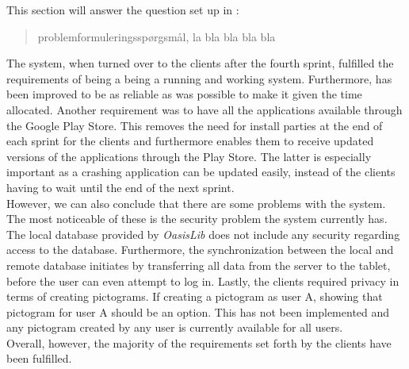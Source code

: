 This section will answer the question set up in :
\begin{quote}
problemformuleringsspørgsmål, la bla bla bla bla
\end{quote}

The system, when turned over to the clients after the fourth sprint, fulfilled the requirements of being a being a running and working system.
Furthermore, \launcher has been improved to be as reliable as was possible to make it given the time allocated.
Another requirement was to have all the \giraf applications available through the Google Play Store.
This removes the need for install parties at the end of each sprint for the clients and furthermore enables them to receive updated versions of the applications through the Play Store. 
The latter is especially important as a crashing application can be updated easily, instead of the clients having to wait until the end of the next sprint.\\

However, we can also conclude that there are some problems with the \giraf system.
The most noticeable of these is the security problem the \giraf system currently has.
The local database provided by \textit{OasisLib} does not include any security regarding access to the database.
Furthermore, the synchronization between the local and remote database initiates by transferring all data from the server to the tablet, before the user can even attempt to log in.
Lastly, the clients required privacy in terms of creating pictograms.
If creating a pictogram as user A, showing that pictogram for user A should be an option.
This has not been implemented and any pictogram created by any user is currently available for all users.\\

Overall, however, the majority of the requirements set forth by the clients have been fulfilled.